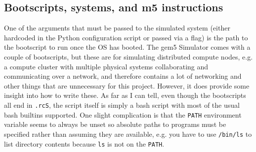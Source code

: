     \subsection{Bootscripts, systems, and m5 instructions}
    \label{subsec:bootscripts-systems-m5}
    One of the arguments that must be passed to the simulated system (either 
    hardcoded in the Python configuration script or passed via a flag) is the 
    path to the bootscript to run once the OS has booted. The gem5 Simulator 
    comes with a couple of bootscripts, but these are for simulating distributed
    compute nodes, e.g. a compute cluster with multiple physical systems 
    collaborating and communicating over a network, and therefore contains a 
    lot of networking and other things that are unnecessary for this project. 
    However, it does provide some insight into how to write these. As far as I 
    can tell, even though the bootscripts all end in \texttt{.rcS}, the script 
    itself is simply a bash script with most of the usual bash builtins 
    supported. One slight complication is that the \texttt{PATH} environment 
    variable seems to always be unset so absolute paths to programs must be 
    specified rather than assuming they are available, e.g. you have to use 
    \texttt{/bin/ls} to list directory contents because \texttt{ls} is not on 
    the \texttt{PATH}.
    
